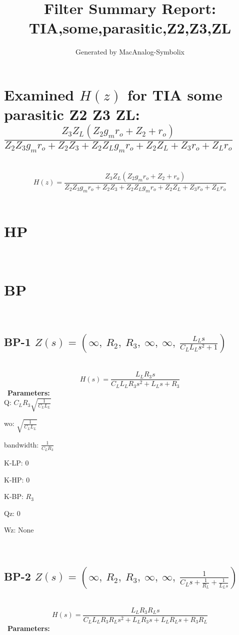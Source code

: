 \documentclass{article}
\begin{document}
        
                        \title{Filter Summary Report: TIA,some,parasitic,Z2,Z3,ZL}
                        \author{Generated by MacAnalog-Symbolix}
                        \maketitle

                        \tableofcontents
                        \newpage
                        \section{Examined $H(z)$ for TIA some parasitic Z2 Z3 ZL: $\frac{Z_{3} Z_{L} \left(Z_{2} g_{m} r_{o} + Z_{2} + r_{o}\right)}{Z_{2} Z_{3} g_{m} r_{o} + Z_{2} Z_{3} + Z_{2} Z_{L} g_{m} r_{o} + Z_{2} Z_{L} + Z_{3} r_{o} + Z_{L} r_{o}}$ }\ 
\textbf{\[H(z) = \frac{Z_{3} Z_{L} \left(Z_{2} g_{m} r_{o} + Z_{2} + r_{o}\right)}{Z_{2} Z_{3} g_{m} r_{o} + Z_{2} Z_{3} + Z_{2} Z_{L} g_{m} r_{o} + Z_{2} Z_{L} + Z_{3} r_{o} + Z_{L} r_{o}}\] }\ 
\section{HP}\ 
\section{BP}\ 
\subsection{BP-1 $Z(s) = \left( \infty, \  R_{2}, \  R_{3}, \  \infty, \  \infty, \  \frac{L_{L} s}{C_{L} L_{L} s^{2} + 1}\right)$ } \ 
\textbf{\[H(s) = \frac{L_{L} R_{3} s}{C_{L} L_{L} R_{3} s^{2} + L_{L} s + R_{3}}\] } \ 
\textbf{Parameters:}\\ 

Q: $C_{L} R_{3} \sqrt{\frac{1}{C_{L} L_{L}}}$\ 

wo: $\sqrt{\frac{1}{C_{L} L_{L}}}$\ 

bandwidth: $\frac{1}{C_{L} R_{3}}$\ 

K-LP: $0$\ 

K-HP: $0$\ 

K-BP: $R_{3}$\ 

Qz: $0$\ 

Wz: $\text{None}$\ 

\ 

\subsection{BP-2 $Z(s) = \left( \infty, \  R_{2}, \  R_{3}, \  \infty, \  \infty, \  \frac{1}{C_{L} s + \frac{1}{R_{L}} + \frac{1}{L_{L} s}}\right)$ } \ 
\textbf{\[H(s) = \frac{L_{L} R_{3} R_{L} s}{C_{L} L_{L} R_{3} R_{L} s^{2} + L_{L} R_{3} s + L_{L} R_{L} s + R_{3} R_{L}}\] } \ 
\textbf{Parameters:}\\ 
\end{document}
